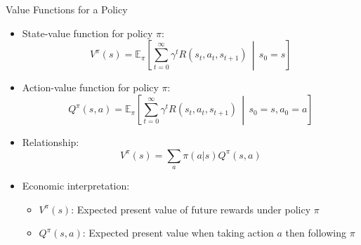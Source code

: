 \documentclass[10pt]{beamer}
\newcommand{\E}{\mathbb{E}}
\begin{document}

\begin{frame}{Value Functions for a Policy}
    \begin{itemize}
        \item State-value function for policy $\pi$:
        \begin{equation}
            V^{\pi}(s) = \E_{\pi}\left[\sum_{t=0}^{\infty} \gamma^t R(s_t, a_t, s_{t+1}) \,\middle|\, s_0 = s\right]
        \end{equation}
        
        \item Action-value function for policy $\pi$:
        \begin{equation}
            Q^{\pi}(s,a) = \E_{\pi}\left[\sum_{t=0}^{\infty} \gamma^t R(s_t, a_t, s_{t+1}) \,\middle|\, s_0 = s, a_0 = a\right]
        \end{equation}
        
        \item Relationship:
        \begin{equation}
            V^{\pi}(s) = \sum_a \pi(a|s) Q^{\pi}(s,a)
        \end{equation}
        
        \item Economic interpretation:
        \begin{itemize}
            \item $V^{\pi}(s)$: Expected present value of future rewards under policy $\pi$
            \item $Q^{\pi}(s,a)$: Expected present value when taking action $a$ then following $\pi$
        \end{itemize}
    \end{itemize}
\end{frame}
\end{document}
